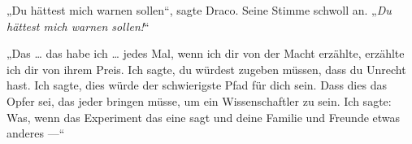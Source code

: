 „Du hättest mich warnen sollen“, sagte Draco. Seine Stimme schwoll an.
„\emph{Du hättest mich warnen sollen!}“

„Das … das habe ich … jedes Mal, wenn ich dir von der Macht erzählte, erzählte ich dir von ihrem Preis. Ich sagte, du würdest zugeben müssen, dass du Unrecht hast. Ich sagte, dies würde der schwierigste Pfad für dich sein. Dass dies das Opfer sei, das jeder bringen müsse, um ein Wissenschaftler zu sein. Ich sagte: Was, wenn das Experiment das eine sagt und deine Familie und Freunde etwas anderes —“